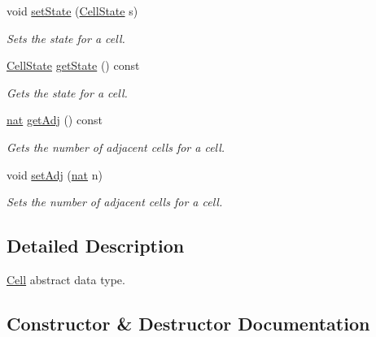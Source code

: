 \begin{DoxyCompactItemize}
void \hyperlink{class_cell_a0a162ed55d7c945b9f44d71a0a9ce5ad}{set\+State} (\hyperlink{_cell_types_8h_ad5292c4e76abc657b113de5594268aa9}{Cell\+State} s)
\begin{DoxyCompactList}\small\item\em Sets the state for a cell. \end{DoxyCompactList}\item 
\mbox{\label{class_cell_a131681c445fdd04a6b91f8e15ef09d1f}} 
\hyperlink{_cell_types_8h_ad5292c4e76abc657b113de5594268aa9}{Cell\+State} \hyperlink{class_cell_a131681c445fdd04a6b91f8e15ef09d1f}{get\+State} () const
\begin{DoxyCompactList}\small\item\em Gets the state for a cell. \end{DoxyCompactList}\item 
\mbox{\label{class_cell_abfddfe3b7b51dc40511ead85d227661b}} 
\hyperlink{_cell_types_8h_a56638ee9d162e8cce3a15f92d2023d6e}{nat} \hyperlink{class_cell_abfddfe3b7b51dc40511ead85d227661b}{get\+Adj} () const
\begin{DoxyCompactList}\small\item\em Gets the number of adjacent cells for a cell. \end{DoxyCompactList}\item 
void \hyperlink{class_cell_a78a948c77f34c1801f427b3b11ddd731}{set\+Adj} (\hyperlink{_cell_types_8h_a56638ee9d162e8cce3a15f92d2023d6e}{nat} n)
\begin{DoxyCompactList}\small\item\em Sets the number of adjacent cells for a cell. \end{DoxyCompactList}\end{DoxyCompactItemize}


\subsection{Detailed Description}
\hyperlink{class_cell}{Cell} abstract data type. 

\subsection{Constructor \& Destructor Documentation}
\mbox{\label{class_cell_a79448546aec44bac1be25a271d256f2a}} 
